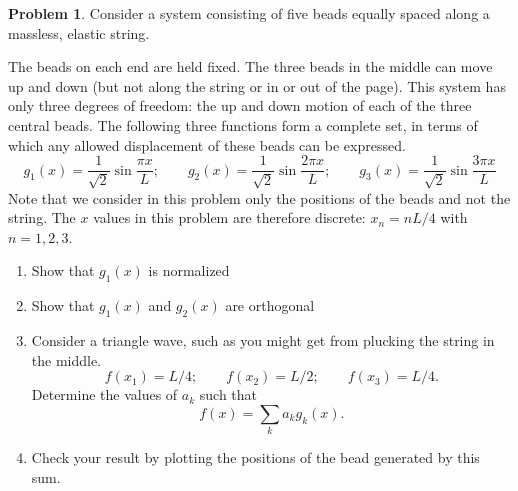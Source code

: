 \documentclass[10pt]{article}
\theoremstyle{definition}
\newtheorem{problem}{Problem}
\begin{document}
\begin{problem}
Consider a system consisting of five beads equally spaced along a massless, elastic string.
\begin{center}
\end{center}
The beads on each end are held fixed. The three beads in the middle can move up and down
(but not along the string or in or out of the page). This system has only three degrees of
freedom: the up and down motion of each of the three central beads. The following three
functions form a complete set, in terms of which any allowed displacement of these beads
can be expressed.
$$
  g_1(x)=\frac{1}{\sqrt{2}}\sin\frac{\pi x}{L};
  \qquad g_2(x)=\frac{1}{\sqrt{2}}\sin\frac{2\pi x}{L};
  \qquad g_3(x)=\frac{1}{\sqrt{2}}\sin\frac{3\pi x}{L}
$$
Note that we consider in this problem only the positions of the beads and not the string.
The $x$ values in this problem are therefore discrete: $x_n = nL/4$ with $n = 1, 2, 3$.
\begin{enumerate}[label=(\alph*)]
  \item Show that $g_1(x)$ is normalized
  \item Show that $g_1(x)$ and $g_2(x)$ are orthogonal
  \item Consider a triangle wave, such as you might get from plucking the string in the middle.
        $$f(x_1)=L/4;\qquad f(x_2)=L/2;\qquad f(x_3)=L/4.$$
        Determine the values of $a_k$ such that
        $$f(x)=\sum_k a_kg_k(x).$$
  \item Check your result by plotting the positions of the bead generated by this sum.
\end{enumerate}
\end{problem}
\end{document}
